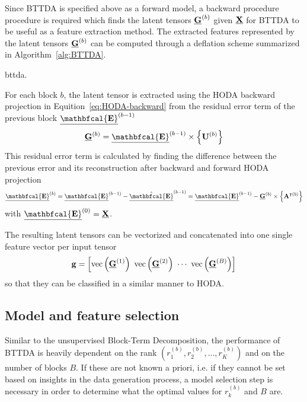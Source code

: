 Since BTTDA is specified above as a forward model, a backward procedure
procedure is required which finds the latent tensors $\underline{\mathbf{G}}^{(b)}$ given $\underline{\mathbf{X}}$ for
BTTDA to be useful as a feature extraction method.
The extracted features represented by the latent tensors $\underline{\mathbf{G}}^{(b)}$ can be
computed through a deflation scheme summarized in Algorithm~\ref{alg:BTTDA}.
\begin{algorithm}
  \caption{\Ac{bttda}.}
	\label{alg:BTTDA}
	
\end{algorithm}
For each block $b$, the latent tensor is extracted using the HODA backward
projection in Equition~\ref{eq:HODA-backward} from the residual error term of the previous
block $\ten{\mathbfcal{E}}^{(b-1)}$
\begin{equation}
	\ten{G}^{(b)} = \ten{\mathbfcal{E}}^{(b-1)}\mmpr{\mat{U}^{(b)}}
\end{equation}
This residual error term is calculated by finding the difference between the
previous error and its reconstruction after backward and forward HODA
projection
\begin{equation}
  \ten{\mathbfcal{E}}^{(b)}
  = \ten{\mathbfcal{E}}^{(b-1)} - \hat{\ten{\mathbfcal{E}}}^{(b-1)}
  = \ten{\mathbfcal{E}}^{(b-1)} - \ten{G}^{(b)}\mmpr{\mat{A}^{\intercal(b)}}
\end{equation}
with $\ten{\mathbfcal{E}}^{(0)}=\ten{X}$.

The resulting latent tensors can be vectorized and concatenated into
one single feature vector per input tensor
\begin{equation}
	\mathbf{g}
	=\left[\operatorname{vec}\left(\underline{\mathbf{G}}^{(1)}\right)\
		\operatorname{vec}\left(\underline{\mathbf{G}}^{(2)}\right)\
		\cdots\
		\operatorname{vec}\left(\underline{\mathbf{G}}^{(B)}\right)\right]
\end{equation}
so that they can be classified in a similar manner to HODA.


\subsection{Model and feature selection}
Similar to the unsupervised Block-Term Decomposition, the performance of BTTDA is
heavily dependent on the rank $(r_1^{(b)}, r_2^{(b)}, \ldots,
	r_K^{(b)})$ and on the number of blocks $B$.
If these are not known a priori, i.e. if they cannot be set based on insights in the
data generation process, a model selection step is necessary in order to
determine what the optimal values for $r_k^{(b)}$ and $B$ are.

